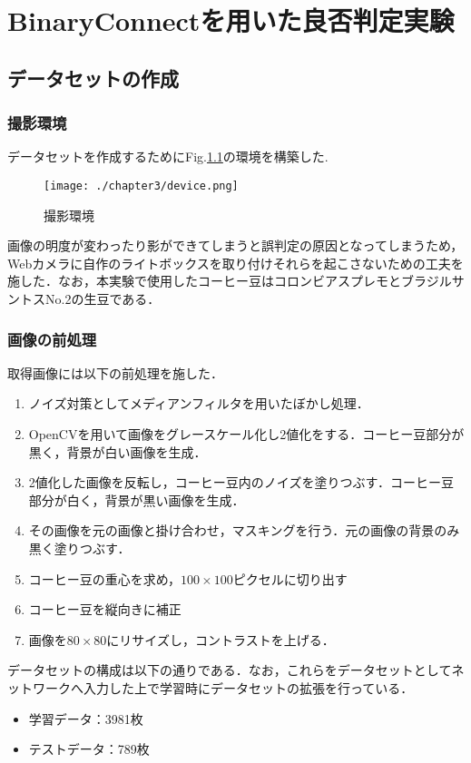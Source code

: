 
\chapter{BinaryConnectを用いた良否判定実験}

\section{データセットの作成}
\subsection{撮影環境}
データセットを作成するためにFig.\ref{fig_camera}の環境を構築した.
\begin{figure}[]
  \begin{center}
    \texttt{[image: ./chapter3/device.png]}
    \caption{撮影環境}
    \label{fig_camera}
  \end{center}
\end{figure}

画像の明度が変わったり影ができてしまうと誤判定の原因となってしまうため，Webカメラに自作のライトボックスを取り付けそれらを起こさないための工夫を施した．なお，本実験で使用したコーヒー豆はコロンビアスプレモとブラジルサントスNo.2の生豆である．

\subsection{画像の前処理}
取得画像には以下の前処理を施した．
\begin{enumerate}
\item ノイズ対策としてメディアンフィルタを用いたぼかし処理．
\item OpenCVを用いて画像をグレースケール化し2値化をする．コーヒー豆部分が黒く，背景が白い画像を生成．
\item 2値化した画像を反転し，コーヒー豆内のノイズを塗りつぶす．コーヒー豆部分が白く，背景が黒い画像を生成．
\item その画像を元の画像と掛け合わせ，マスキングを行う．元の画像の背景のみ黒く塗りつぶす．
\item コーヒー豆の重心を求め，$100\times 100$ピクセルに切り出す
\item コーヒー豆を縦向きに補正
\item 画像を$80\times 80$にリサイズし，コントラストを上げる．
\end{enumerate}

データセットの構成は以下の通りである．なお，これらをデータセットとしてネットワークへ入力した上で学習時にデータセットの拡張を行っている．
\begin{itemize}
  \item 学習データ：3981枚
  \item テストデータ：789枚
\end{itemize}

